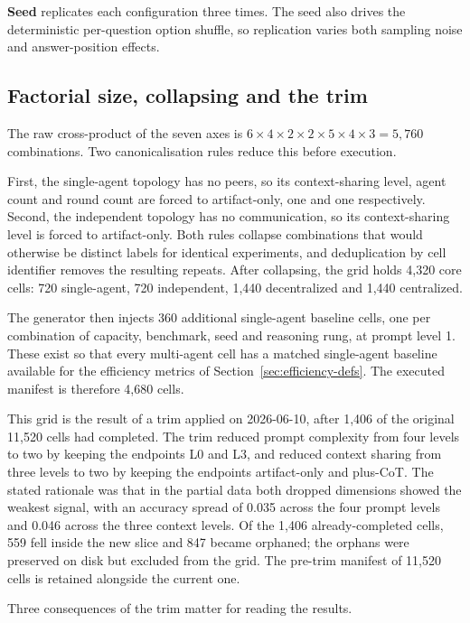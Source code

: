 \textbf{Seed} replicates each configuration three times. The seed also drives the
deterministic per-question option shuffle, so replication varies both sampling noise and
answer-position effects.

\subsection{Factorial size, collapsing and the trim}
\label{sec:trim}

The raw cross-product of the seven axes is $6 \times 4 \times 2 \times 2 \times 5 \times
4 \times 3 = 5{,}760$ combinations. Two canonicalisation rules reduce this before
execution.

First, the single-agent topology has no peers, so its context-sharing level, agent count
and round count are forced to artifact-only, one and one respectively. Second, the
independent topology has no communication, so its context-sharing level is forced to
artifact-only. Both rules collapse combinations that would otherwise be distinct labels
for identical experiments, and deduplication by cell identifier removes the resulting
repeats. After collapsing, the grid holds 4{,}320 core cells: 720 single-agent, 720
independent, 1{,}440 decentralized and 1{,}440 centralized.

The generator then injects 360 additional single-agent baseline cells, one per
combination of capacity, benchmark, seed and reasoning rung, at prompt level 1. These
exist so that every multi-agent cell has a matched single-agent baseline available for
the efficiency metrics of Section~\ref{sec:efficiency-defs}. The executed manifest is
therefore 4{,}680 cells.

This grid is the result of a trim applied on 2026-06-10, after 1{,}406 of the original
11{,}520 cells had completed. The trim reduced prompt complexity from four levels to two
by keeping the endpoints L0 and L3, and reduced context sharing from three levels to two
by keeping the endpoints artifact-only and plus-CoT. The stated rationale was that in the
partial data both dropped dimensions showed the weakest signal, with an accuracy spread
of 0.035 across the four prompt levels and 0.046 across the three context levels. Of the
1{,}406 already-completed cells, 559 fell inside the new slice and 847 became orphaned;
the orphans were preserved on disk but excluded from the grid. The pre-trim manifest of
11{,}520 cells is retained alongside the current one.

Three consequences of the trim matter for reading the results.

